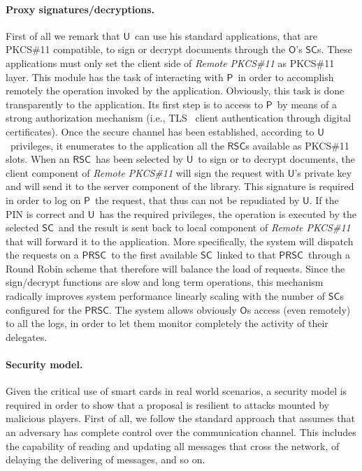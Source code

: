 \documentclass[runningheads]{llncs}
\newcommand{\Owner}{\ensuremath{\mathsf{O}}}
\newcommand{\User}{\ensuremath{\mathsf{U}}}
\newcommand{\Proxy}{\ensuremath{\mathsf{P}}}
\newcommand{\SC}{\ensuremath{\mathsf{SC}}}
\newcommand{\RSC}{\ensuremath{\mathsf{RSC}}}
\newcommand{\PRSC}{\ensuremath{\mathsf{PRSC}}}
\begin{document}
\paragraph{Proxy signatures/decryptions.}
First of all we remark that \User\ can use his standard applications, that are PKCS\#11 compatible, to sign or decrypt documents through the \Owner 's \SC s. These applications must only set the client side of  \emph{Remote PKCS\#11}  as PKCS\#11 layer. This module has the task of interacting with \Proxy\ in order to accomplish remotely the operation invoked by the application. Obviously, this task is done transparently to the application. Its first step is to access to \Proxy\  by means of a strong authorization mechanism (i.e., TLS~\cite{TLS} client authentication through digital certificates). Once the secure channel has been established, according to \User\ privileges, it enumerates to the application all the \RSC s available as PKCS\#11 slots.  When an \RSC\ has been selected by \User\  to sign or to decrypt documents, the client component of \emph{Remote PKCS\#11}  will sign the request with \User 's private key and will send it to the server component of the library. This signature is required in order to log on \Proxy\ the request, that thus can not be repudiated by \User. If the PIN is correct and \User\ has the required privileges, the operation is executed by the selected \SC\ and the result is sent back to local component of  \emph{Remote PKCS\#11} that will forward it to the application. More specifically, the system will dispatch the requests on a \PRSC\ to the first available \SC\ linked to that \PRSC\ through a Round Robin scheme that therefore will balance the load of requests. Since the sign/decrypt functions are slow and long term operations, this mechanism radically improves system performance linearly scaling with the number of \SC s configured for the \PRSC.
The system allows obviously \Owner s access (even remotely) to all the logs, in order to let them monitor completely the activity of their delegates.


\paragraph{Security model.}
Given the critical use of smart cards in real world scenarios, a security model is required in order to show that a proposal is resilient to attacks mounted by malicious players. First of all, we follow the standard approach that assumes that an adversary has complete control over the communication channel. This includes the capability of reading and updating all messages that cross the network, of delaying the delivering of messages, and so on.
\end{document}
